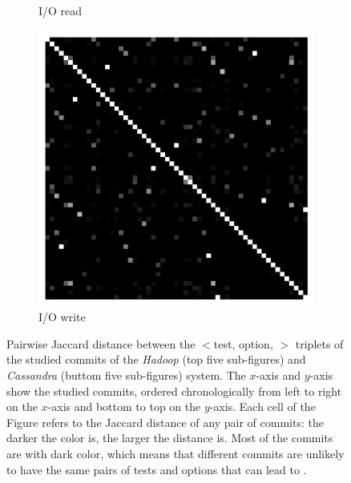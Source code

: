 \begin{figure}[t]
\begin{subfigure}{0.19\textwidth}
                \caption{I/O read}
        \end{subfigure}
        \begin{subfigure}{0.19\textwidth}
                \includegraphics[width=\linewidth]{Figures/cassandra-iowrite-commitX.pdf}
                \caption{I/O write}
        \end{subfigure}
        
	\caption{Pairwise Jaccard distance between the $<$test, option, \inconsistent$>$ triplets of the studied commits of the \emph{Hadoop} (top five sub-figures) and \emph{Cassandra} (buttom five sub-figures) system. The $x$-axis and $y$-axis show the studied commits, ordered chronologically from left to right on the $x$-axis and bottom to top on the $y$-axis. Each cell of the Figure refers to the Jaccard distance of any pair of commits: the darker the color is, the larger the distance is. Most of the commits are with dark color, which means that different commits are unlikely to have the same pairs of tests and options that can lead to \inconsistent.}
	\label{fig:across-commit}
\end{figure}
